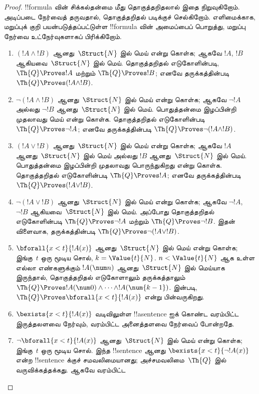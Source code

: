 \documentclass[../../../include/open-logic-section]{subfiles}
\begin{document}
\begin{proof}
!!{formula} வின் சிக்கல்தன்மை மீது தொகுத்தறிதலால் இதை நிறுவுகிறோம்.
%
 அடிப்படை நேர்வைத் தருவதால், தொகுத்தறிதல்
படிக்குச் செல்கிறோம். எளிமைக்காக, மறுப்புக் குறி பயன்படுத்தப்பட்டுள்ள
!!{formula} வின் அமைப்பைப் பொறுத்து, மறுப்பு நேர்வை உட்நேர்வுகளாகப்
பிரிக்கிறோம்.

\begin{enumerate}
\item $(!A \land !B)$ ஆனது~$\Struct{N}$ இல் மெய் என்று கொள்க;
ஆகவே $!A$, $!B$ ஆகியவை~$\Struct{N}$ இல் மெய்.
தொகுத்தறிதல் எடுகோளின்படி, $\Th{Q} \Proves !A$ மற்றும்
$\Th{Q} \Proves !B$; எனவே தருக்கத்தின்படி
$\Th{Q} \Proves (!A \land !B)$.
%
\item $\lnot (!A \land !B)$ ஆனது~$\Struct{N}$ இல் மெய் என்று கொள்க;
ஆகவே $\lnot !A$ அல்லது $\lnot !B$ ஆனது~$\Struct{N}$ இல் மெய்.
பொதுத்தன்மை இழப்பின்றி முதலாவது மெய் என்று கொள்க. தொகுத்தறிதல்
எடுகோளின்படி $\Th{Q} \Proves \lnot !A$; எனவே தருக்கத்தின்படி
$\Th{Q} \Proves \lnot (!A \land !B)$.
%
\item $(!A \lor !B)$ ஆனது~$\Struct{N}$ இல் மெய் என்று கொள்க; ஆகவே
$!A$ ஆனது~$\Struct{N}$ இல் மெய் அல்லது $!B$ ஆனது~$\Struct{N}$ இல் மெய்.
பொதுத்தன்மை இழப்பின்றி முதலாவது பொருந்துகிறது என்று கொள்க. தொகுத்தறிதல்
எடுகோளின்படி $\Th{Q} \Proves !A$; எனவே தருக்கத்தின்படி
$\Th{Q} \Proves (!A \lor !B)$.
%
\item $\lnot(!A \lor !B)$ ஆனது~$\Struct{N}$ இல் மெய் என்று கொள்க;
ஆகவே $\lnot !A$, $\lnot !B$ ஆகியவை~$\Struct{N}$ இல் மெய்.
அப்போது தொகுத்தறிதல் எடுகோளின்படி $\Th{Q} \Proves \lnot !A$ மற்றும்
$\Th{Q} \Proves \lnot !B$. இதன் விளைவாக, தருக்கத்தின்படி
$\Th{Q} \Proves \lnot(!A \lor !B)$.
%
\item $\bforall{x<t}{!A(x)}$ ஆனது~$\Struct{N}$ இல் மெய் என்று கொள்க;
இங்கு~$t$ ஒரு மூடிய சொல், $k=\Value{t}{N}$.
$n < \Value{t}{N}$ ஆக உள்ள எல்லா எண்களுக்கும்
$!A(\num n)$ ஆனது~$\Struct{N}$ இல் மெய்யாக இருந்தால், தொகுத்தறிதல்
எடுகோளாலும் தருக்கத்தாலும்
$\Th{Q} \Proves !A(\num 0) \land \dots \land !A(\num{k-1})$.
 இன்படி,
$\Th{Q} \Proves \bforall{x<t}{!A(x)}$ என்று பின்வருகிறது.
%
\item $\bexists{x < t}{!A(x)}$ வடிவிலுள்ள !!a{sentence} ஐக் கொண்ட
வரம்பிட்ட இருத்தலளவை நேர்வும், வரம்பிட்ட அனைத்தளவை நேர்வைப் போன்றதே.
%
\item $\lnot \bforall{x<t}{!A(x)}$ ஆனது~$\Struct{N}$ இல் மெய் என்று
கொள்க; இங்கு~$t$ ஒரு மூடிய சொல். இந்த !!{sentence} ஆனது
$\bexists{x<t}{\lnot !A(x)}$ என்ற !!{sentence} க்குச் சமவலிமையானது;
அச்சமவலிமை~$\Th{Q}$ இல் வருவிக்கத்தக்கது. ஆகவே வரம்பிட்ட

\end{enumerate}
\end{proof}
\end{document}
